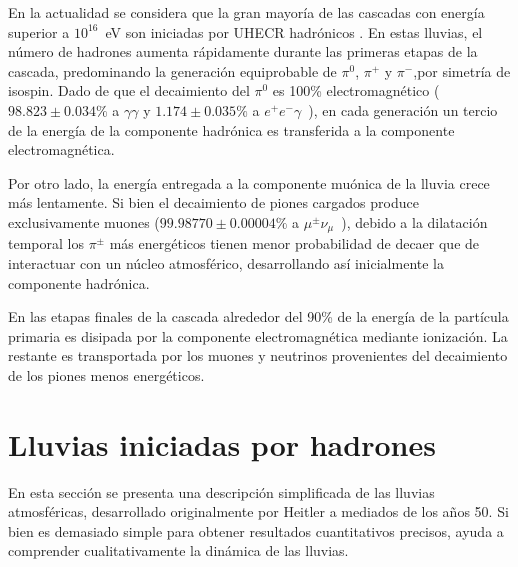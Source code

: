 En la actualidad se considera que la gran mayoría de las cascadas con energía superior a $10^{16}$~eV son iniciadas por UHECR hadrónicos \cite{CONSEGUIR}. 
En estas lluvias, el número de hadrones aumenta rápidamente durante las primeras etapas de la cascada, predominando la generaci\'on equiprobable de $\pi^{0}$, $\pi^{+}$ y $\pi^{-}$,por simetría de isospin.
Dado de que el decaimiento del $\pi^{0}$ es 100\% electromagnético ($98.823\pm0.034\%$ a $\gamma\gamma$ y $1.174\pm0.035\%$ a $e^+e^-\gamma$~\cite{Agashe:2014kda}), en cada generación un tercio de la energía de la componente hadr\'onica es transferida a la componente electromagnética.

Por otro lado, la energ\'ia entregada a la componente muónica de la lluvia crece más lentamente. 
Si bien el decaimiento de piones cargados produce exclusivamente muones ($99.98770\pm0.00004\%$ a $\mu^{\pm}\nu_\mu$~\cite{Agashe:2014kda}), debido a la dilatación temporal los $\pi^{\pm}$ más energéticos tienen menor probabilidad de decaer que de interactuar con un n\'ucleo atmosf\'erico, desarrollando así inicialmente la componente hadrónica.

En las etapas finales de la cascada alrededor del 90\% de la energía de la partícula primaria es disipada por la componente electromagnética mediante ionización. La restante es transportada por los muones y neutrinos provenientes del decaimiento de los piones menos energéticos.

\section{Lluvias iniciadas por hadrones}
En esta sección se presenta una descripción simplificada de las lluvias atmosféricas, desarrollado originalmente por Heitler \cite{hei54} a mediados de los años 50. Si bien es demasiado simple para obtener resultados cuantitativos precisos, ayuda a comprender cualitativamente la dinámica de las lluvias.


